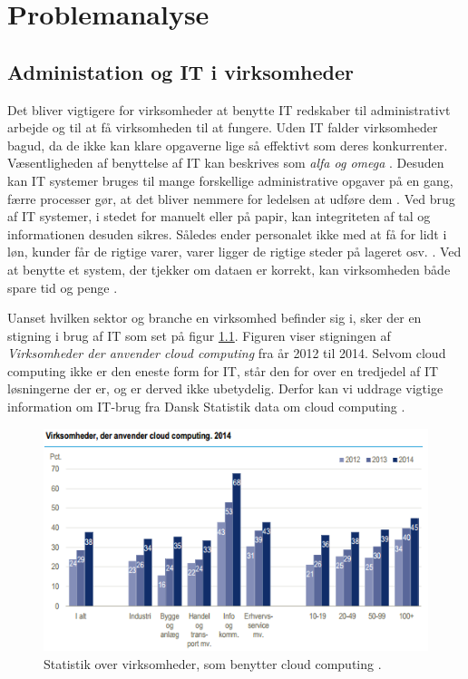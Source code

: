 \chapter{Problemanalyse}\label{ch:analyse}
\section{Administation og IT i virksomheder}

Det bliver vigtigere for virksomheder at benytte IT redskaber til administrativt arbejde og til at få virksomheden til at fungere. Uden IT falder virksomheder bagud, da de ikke kan klare opgaverne lige så effektivt som deres konkurrenter. Væsentligheden af benyttelse af IT kan beskrives som \textit{alfa og omega} \citep{case_green_team}. Desuden kan IT systemer bruges til mange forskellige administrative opgaver på en gang, færre processer gør, at det bliver nemmere for ledelsen at udføre dem \citep{Ibiz_streamline}. Ved brug af IT systemer, i stedet for manuelt eller på papir, kan integriteten af tal og informationen desuden sikres. Således ender personalet ikke med at få for lidt i løn, kunder får de rigtige varer, varer ligger de rigtige steder på lageret osv. \citep{Ibiz_streamline}. Ved at benytte et system, der tjekker om dataen er korrekt, kan virksomheden både spare tid og penge \citep{case_green_team}. 

Uanset hvilken sektor og branche en virksomhed befinder sig i, sker der en stigning i brug af IT som set på figur \ref{fig:virksomcc}. Figuren viser stigningen af \textit{Virksomheder der anvender cloud computing} fra år 2012 til 2014. Selvom cloud computing ikke er den eneste form for IT, står den for over en tredjedel af IT løsningerne der er, og er derved ikke ubetydelig. Derfor kan vi uddrage vigtige information om IT-brug fra Dansk Statistik data om cloud computing \citep{itvirk}.

\begin{figure}[p]
    \centering
    \includegraphics[width=1\textwidth]{figures/virksomhederderanvendercc.png}
    \caption{Statistik over virksomheder, som benytter cloud computing \citep{itvirk}.} 
    \label{fig:virksomcc}
\end{figure}

